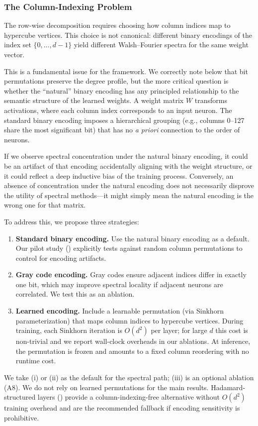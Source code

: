 \documentclass[12pt,a4paper]{article}
\theoremstyle{plain}
\theoremstyle{definition}
\theoremstyle{remark}
\begin{document}
\subsubsection{The Column-Indexing Problem}\label{sec:column-indexing}

The row-wise decomposition requires choosing how column indices map to hypercube vertices. This choice is not canonical: different binary encodings of the index set $\{0, \ldots, d-1\}$ yield different Walsh--Fourier spectra for the same weight vector.

This is a fundamental issue for the framework. We correctly note below that bit permutations preserve the degree profile, but the more critical question is whether the ``natural'' binary encoding has any principled relationship to the semantic structure of the learned weights. A weight matrix $W$ transforms activations, where each column index corresponds to an input neuron. The standard binary encoding imposes a hierarchical grouping (e.g., columns 0--127 share the most significant bit) that has no \textit{a priori} connection to the order of neurons.

If we observe spectral concentration under the natural binary encoding, it could be an artifact of that encoding accidentally aligning with the weight structure, or it could reflect a deep inductive bias of the training process. Conversely, an absence of concentration under the natural encoding does not necessarily disprove the utility of spectral methods---it might simply mean the natural encoding is the wrong one for that matrix.

To address this, we propose three strategies:
\begin{enumerate}[label=(\roman*)]
    \item \textbf{Standard binary encoding.} Use the natural binary encoding as a default. Our pilot study () explicitly tests against random column permutations to control for encoding artifacts.
    \item \textbf{Gray code encoding.} Gray codes ensure adjacent indices differ in exactly one bit, which may improve spectral locality if adjacent neurons are correlated. We test this as an ablation.
    \item \textbf{Learned encoding.} Include a learnable permutation (via Sinkhorn parameterization) that maps column indices to hypercube vertices. During training, each Sinkhorn iteration is $O(d^2)$ per layer; for large $d$ this cost is non-trivial and we report wall-clock overheads in our ablations. At inference, the permutation is frozen and amounts to a fixed column reordering with no runtime cost.
\end{enumerate}
We take (i) or (ii) as the default for the spectral path; (iii) is an optional ablation (A8). We do not rely on learned permutations for the main results. Hadamard-structured layers () provide a column-indexing-free alternative without $O(d^2)$ training overhead and are the recommended fallback if encoding sensitivity is prohibitive.
\end{document}
